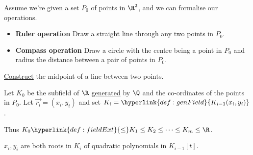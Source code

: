 \documentclass{article}
\begin{document}
Assume we're given a set $P_0$ of points in $\R^2$, and we can formalise our operations.
\begin{itemize}[label={}, leftmargin=*]
    \item \textbf{Ruler operation} Draw a straight line through any two points in $P_0$.
    \item \textbf{Compass operation} Draw a circle with the centre being a point in $P_0$ and radius the distance between a pair of points in $P_0$.
\end{itemize}


\begin{exercise}
    \hyperlink{def:constructible}{Construct} the midpoint of a line between two points.
\end{exercise}

Let $K_0$ be the subfield of $\R$ \hyperlink{def:genField}{generated} by $\Q$ and the co-ordinates of the points in $P_0$.
Let $\vec{r_i} = (x_i, y_i)$ and set $K_i = \hyperlink{def:genField}{K_{i-1} (x_i, y_i)}$.

Thus $K_0 \hyperlink{def:fieldExt}{\leq} K_1 \leq K_2 \leq \dots \leq K_m \leq \R$.

\begin{nlemma}\label{lem:1.13}
    $x_i, y_i$ are both roots in $K_i$ of quadratic polynomials in $K_{i-1}[t]$.
\end{nlemma}
\end{document}
